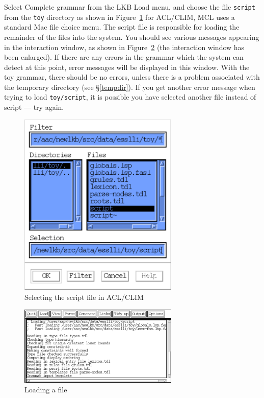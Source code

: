 \documentclass[12pt]{report}
\newcommand{\filename}[1]{{\tt #1}}
\newcommand{\lkbmenucommand}{{\bf}}
\begin{document}
Select {\lkbmenucommand Complete grammar} from the LKB {\lkbmenucommand Load}
menu, and choose the file \filename{script} from the \filename{toy} directory
as shown in Figure~\ref{loadscript} for ACL/CLIM, MCL uses a standard
Mac file choice menu.
The script file is responsible for
loading the remainder of the files into the system.  You should see various
messages appearing in the interaction window, as shown in
Figure~\ref{loadmess}
(the interaction window has been enlarged).  
If there are any errors in the grammar which the system
can detect at this point, error messages will be displayed in this window.
With the toy grammar, there should be no errors, unless there is a problem 
associated with the temporary directory (see \S\ref{tempdir}).
If
you get another error message when trying to load 
\filename{toy/script}, it is
possible you have selected another file instead of script --- try again.
\begin{figure}
\includegraphics[width=3in]{figs/loadscript}
\caption{Selecting the script file in ACL/CLIM}
\label{loadscript}
\end{figure}
\begin{figure}
\includegraphics[width=3in]{figs/loadmess}
\caption{Loading a file}
\label{loadmess}
\end{figure}
\end{document}
